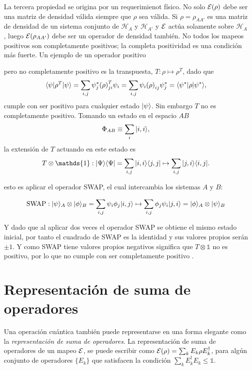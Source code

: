 La tercera propiedad se origina por un requerimienot físico. No solo $\mathcal{E}(\rho)$ debe ser una matriz de densidad válida siempre que $\rho$ sea válida. Si $\rho=\rho_{AA'}$ es una matriz de densidad de un sistema conjunto de $\mathcal{H}_A$ y $\mathcal{H}_{A'}$  y $\mathcal{E}$ actúa solamente sobre $\mathcal{H}_A$, luego $\mathcal{E}(\rho_{AA'})$  debe ser un operador de densidad también. No todos los mapeos positivos son completamente positivos; la completa positividad es una condición más fuerte. Un ejemplo de un operador positivo


pero no completamente positivo es la transpuesta, $T:\rho \mapsto {\rho}^T$, dado que \[\langle \psi |{\rho}^T| \psi \rangle=\sum_{i,j} \psi _j^* {(\rho)}^T _{ji} \psi _i=\sum _{i,j} \psi _i{(\rho)} _{ij} \psi_j^{*}=\langle {\psi}^*|\rho|\psi ^*\rangle,\] cumple con ser positivo para cualquier estado $| \psi \rangle$. Sin embargo $ {T} $ no es completamente positivo. Tomando un estado en el espacio $AB$ \[\Phi_{AB} \equiv \sum_i |i,i\rangle, \] la extensión de $T$ actuando en este estado es \[T \otimes \mathds{1}:|\Psi\rala \Psi|=\sum_{i,j}|i,i\rala j,j| \mapsto \sum_{i,j}|j,i\rala i,j|. \]

esto es aplicar el operador SWAP, el cual intercambia los sistemas $A$ y $B$:

\begin{equation}
    \text{SWAP}:|\psi\rangle_A\otimes|\phi\rangle_B=\sum_{i,j}\psi_i\phi_j |i,j\rangle\mapsto\sum_{i,j}\phi_j\psi_i|j,i\rangle=|\phi\rangle_A\otimes|\psi\rangle_B
\end{equation}

Y dado que al aplicar dos veces el operador SWAP se obtiene el mismo estado inicial, por tanto el cuadrado de SWAP es la identidad y sus valores propios serán $\pm 1$. Y como SWAP tiene valores propios negativos significa que $T \otimes \mathds{1}$ no es positivo, por lo que no cumple con ser completamente positivo  {\cite{preskill2020quantum}}.





\section{Representación de suma de operadores}

Una operación cuántica también puede representarse en una forma elegante como la \textit{representación de suma de operadores}. La representación de suma de operadores de un mapeo $\mathcal{E}$, se puede escribir como $\mathcal{E}(\rho)=\sum_k E_k \rho E_k^\dagger$, para algún conjunto de operadores $\{E_k\}$ que satisfacen la condición $\sum_k E_k^\dagger E_k\le \mathds{1}$.

